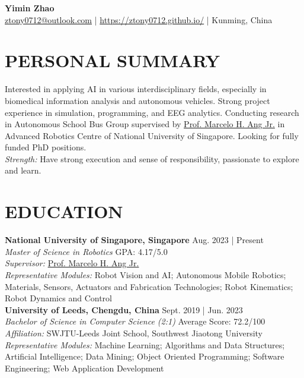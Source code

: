\documentclass[a4paper,9pt]{extarticle}
\begin{document}
\pagestyle{fancy}
\renewcommand{\headrulewidth}{0pt}
\fancyhead{}
\fancyhead[R]{\textit{\today}}
\thispagestyle{empty} %

\begin{center}
\textbf{\Huge Yimin Zhao}\\ %

\faEnvelope \href{mailto:ztony0712@outlook.com}{ztony0712@outlook.com} | 
\faGlobe \href{https://ztony0712.github.io/}{https://ztony0712.github.io/} | 
\faHome Kunming, China %
\end{center}

\section*{PERSONAL SUMMARY}
\noindent
Interested in applying AI in various interdisciplinary fields, especially in biomedical information analysis and autonomous vehicles. Strong project experience in simulation, programming, and EEG analytics. Conducting research in Autonomous School Bus Group supervised by \href{https://guppy.mpe.nus.edu.sg/~mpeangh/}{Prof. Marcelo H. Ang Jr.} in Advanced Robotics Centre of National University of Singapore. Looking for fully funded PhD positions. \\

\noindent
\textit{Strength:} Have strong execution and sense of responsibility, passionate to explore and learn.

\section*{EDUCATION}
\noindent
\textbf{National University of Singapore, Singapore} \hfill Aug. 2023 | Present \\ %
\textit{Master of Science in Robotics} \hfill GPA: 4.17/5.0 \\
\textit{Supervisor:} \href{https://guppy.mpe.nus.edu.sg/~mpeangh/}{Prof. Marcelo H. Ang Jr.} \\
\textit{Representative Modules:} Robot Vision and AI; Autonomous Mobile Robotics; Materials, Sensors, Actuators and Fabrication Technologies; Robot Kinematics; Robot Dynamics and Control  \\

\noindent
\textbf{University of Leeds, Chengdu, China} \hfill Sept. 2019 | Jun. 2023 \\ %
\textit{Bachelor of Science in Computer Science (2:1)}  \hfill Average Score: 72.2/100 \\ %
\textit{Affiliation:} SWJTU-Leeds Joint School, Southwest Jiaotong University \\
\textit{Representative Modules:} Machine Learning; Algorithms and Data Structures; Artificial Intelligence; Data Mining; Object Oriented Programming; Software Engineering; Web Application Development
\end{document}
